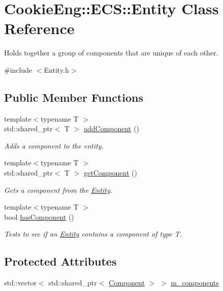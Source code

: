 \hypertarget{class_cookie_eng_1_1_e_c_s_1_1_entity}{}\section{Cookie\+Eng\+:\+:E\+CS\+:\+:Entity Class Reference}
\label{class_cookie_eng_1_1_e_c_s_1_1_entity}


Holds together a group of components that are unique of each other.  




{\ttfamily \#include $<$Entity.\+h$>$}

\subsection*{Public Member Functions}
\begin{DoxyCompactItemize}
\item 
{\footnotesize template$<$typename T $>$ }\\std\+::shared\+\_\+ptr$<$ T $>$ \hyperlink{class_cookie_eng_1_1_e_c_s_1_1_entity_a7b24f6959d8f1686e02e8ae5ef61f08c}{add\+Component} ()
\begin{DoxyCompactList}\small\item\em Adds a component to the entity. \end{DoxyCompactList}\item 
{\footnotesize template$<$typename T $>$ }\\std\+::shared\+\_\+ptr$<$ T $>$ \hyperlink{class_cookie_eng_1_1_e_c_s_1_1_entity_a7e954d74445ccffe29412c885d97bf63}{get\+Component} ()
\begin{DoxyCompactList}\small\item\em Gets a component from the \hyperlink{class_cookie_eng_1_1_e_c_s_1_1_entity}{Entity}. \end{DoxyCompactList}\item 
{\footnotesize template$<$typename T $>$ }\\bool \hyperlink{class_cookie_eng_1_1_e_c_s_1_1_entity_a594daff6ddf321ac9c3a2fad3e50620e}{has\+Component} ()
\begin{DoxyCompactList}\small\item\em Tests to see if an \hyperlink{class_cookie_eng_1_1_e_c_s_1_1_entity}{Entity} contains a component of type T. \end{DoxyCompactList}\end{DoxyCompactItemize}
\subsection*{Protected Attributes}
\begin{DoxyCompactItemize}
\item 
std\+::vector$<$ std\+::shared\+\_\+ptr$<$ \hyperlink{class_cookie_eng_1_1_e_c_s_1_1_component}{Component} $>$ $>$ \hyperlink{class_cookie_eng_1_1_e_c_s_1_1_entity_a5c8b8b6f07c07b97e898ece5dab38517}{m\+\_\+components}
\end{DoxyCompactItemize}


